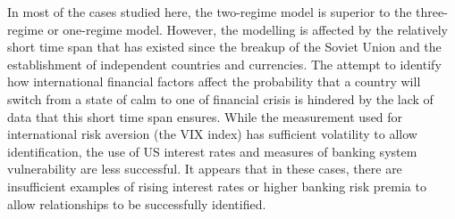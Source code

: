 \documentclass[12pt, a4paper, oneside]{article}\usepackage[]{graphicx}\usepackage[]{color}
\begin{document}
In most of the cases studied here, the two-regime model is superior to the three-regime or one-regime model. However, the modelling is affected by the relatively short time span that has existed since the breakup of the Soviet Union and the establishment of independent countries and currencies.  The attempt to identify how international financial factors affect the probability that a country will switch from a state of calm to one of financial crisis is hindered by the lack of data that this short time span ensures.  While the measurement used for international risk aversion (the VIX index) has sufficient volatility to allow identification, the use of US interest rates and measures of banking system vulnerability are less successful.  It appears that in these cases, there are insufficient examples of rising interest rates or higher banking risk premia to allow relationships to be successfully identified.  




\end{document}
